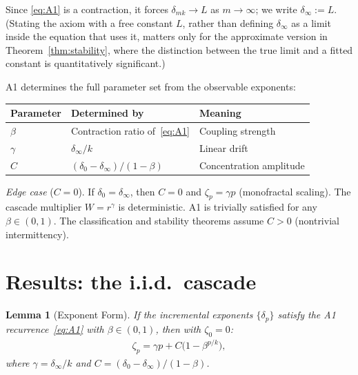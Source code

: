 \documentclass[pdflatex,sn-mathphys-num]{sn-jnl}
\theoremstyle{thmstyleone}
\newtheorem{lemma}[theorem]{Lemma}
\theoremstyle{thmstyletwo}
\theoremstyle{thmstylethree}
\begin{document}
Since \eqref{eq:A1} is a contraction, it forces
$\delta_{mk} \to L$ as $m \to \infty$; we write
$\delta_\infty := L$.  (Stating the axiom with a free constant $L$,
rather than defining $\delta_\infty$ as a limit inside the equation
that uses it, matters only for the approximate version in
Theorem~\ref{thm:stability}, where the distinction between the true
limit and a fitted constant is quantitatively significant.)

A1 determines the full parameter set from the observable exponents:
\begin{center}\small
\begin{tabular}{@{}lll@{}}
\toprule
Parameter & Determined by & Meaning \\
\midrule
$\beta$ & Contraction ratio of~\eqref{eq:A1} & Coupling strength \\
$\gamma$ & $\delta_\infty / k$ & Linear drift \\
$C$ & $(\delta_0 - \delta_\infty)/(1 - \beta)$ & Concentration amplitude \\
\bottomrule
\end{tabular}
\end{center}

\smallskip\noindent\textit{Edge case} ($C = 0$).  If $\delta_0 =
\delta_\infty$, then $C = 0$ and $\zeta_p = \gamma p$ (monofractal
scaling).  The cascade multiplier $W = r^\gamma$ is deterministic.
A1 is trivially satisfied for any $\beta \in (0,1)$.  The
classification and stability theorems assume $C > 0$ (nontrivial
intermittency).


\section{Results: the i.i.d.\ cascade}
\label{sec:results}


\begin{lemma}[Exponent Form]\label{lem:exponent}
If the incremental exponents $\{\delta_p\}$ satisfy the A1
recurrence~\eqref{eq:A1} with $\beta \in (0,1)$, then with $\zeta_0
= 0$:
\begin{align}\label{eq:zeta}
  \zeta_p = \gamma p + C\bigl(1 - \beta^{p/k}\bigr),
  \tag{$**$}
\end{align}
where $\gamma = \delta_\infty / k$ and $C = (\delta_0 -
\delta_\infty)/(1 - \beta)$.
\end{lemma}
\end{document}
